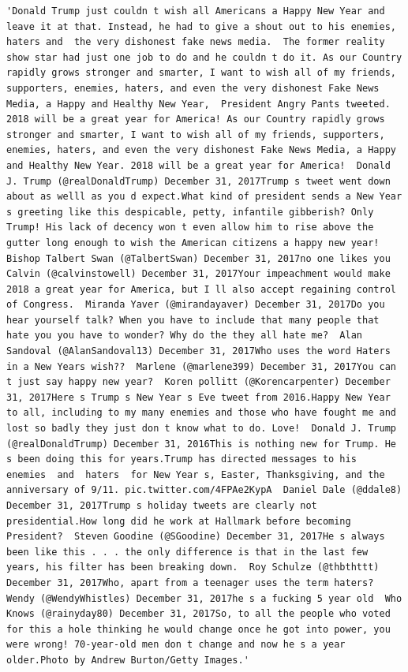 \documentclass[
  11pt,
  a4paper,
]{article}
\begin{document}
\begin{verbatim}
'Donald Trump just couldn t wish all Americans a Happy New Year and leave it at that. Instead, he had to give a shout out to his enemies, haters and  the very dishonest fake news media.  The former reality show star had just one job to do and he couldn t do it. As our Country rapidly grows stronger and smarter, I want to wish all of my friends, supporters, enemies, haters, and even the very dishonest Fake News Media, a Happy and Healthy New Year,  President Angry Pants tweeted.  2018 will be a great year for America! As our Country rapidly grows stronger and smarter, I want to wish all of my friends, supporters, enemies, haters, and even the very dishonest Fake News Media, a Happy and Healthy New Year. 2018 will be a great year for America!  Donald J. Trump (@realDonaldTrump) December 31, 2017Trump s tweet went down about as welll as you d expect.What kind of president sends a New Year s greeting like this despicable, petty, infantile gibberish? Only Trump! His lack of decency won t even allow him to rise above the gutter long enough to wish the American citizens a happy new year!  Bishop Talbert Swan (@TalbertSwan) December 31, 2017no one likes you  Calvin (@calvinstowell) December 31, 2017Your impeachment would make 2018 a great year for America, but I ll also accept regaining control of Congress.  Miranda Yaver (@mirandayaver) December 31, 2017Do you hear yourself talk? When you have to include that many people that hate you you have to wonder? Why do the they all hate me?  Alan Sandoval (@AlanSandoval13) December 31, 2017Who uses the word Haters in a New Years wish??  Marlene (@marlene399) December 31, 2017You can t just say happy new year?  Koren pollitt (@Korencarpenter) December 31, 2017Here s Trump s New Year s Eve tweet from 2016.Happy New Year to all, including to my many enemies and those who have fought me and lost so badly they just don t know what to do. Love!  Donald J. Trump (@realDonaldTrump) December 31, 2016This is nothing new for Trump. He s been doing this for years.Trump has directed messages to his  enemies  and  haters  for New Year s, Easter, Thanksgiving, and the anniversary of 9/11. pic.twitter.com/4FPAe2KypA  Daniel Dale (@ddale8) December 31, 2017Trump s holiday tweets are clearly not presidential.How long did he work at Hallmark before becoming President?  Steven Goodine (@SGoodine) December 31, 2017He s always been like this . . . the only difference is that in the last few years, his filter has been breaking down.  Roy Schulze (@thbthttt) December 31, 2017Who, apart from a teenager uses the term haters?  Wendy (@WendyWhistles) December 31, 2017he s a fucking 5 year old  Who Knows (@rainyday80) December 31, 2017So, to all the people who voted for this a hole thinking he would change once he got into power, you were wrong! 70-year-old men don t change and now he s a year older.Photo by Andrew Burton/Getty Images.'
\end{verbatim}
\end{document}
